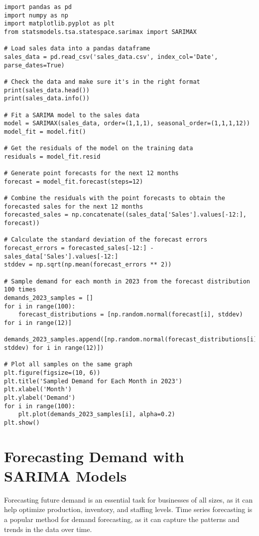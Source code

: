\begin{verbatim}
import pandas as pd
import numpy as np
import matplotlib.pyplot as plt
from statsmodels.tsa.statespace.sarimax import SARIMAX

# Load sales data into a pandas dataframe
sales_data = pd.read_csv('sales_data.csv', index_col='Date', parse_dates=True)

# Check the data and make sure it's in the right format
print(sales_data.head())
print(sales_data.info())

# Fit a SARIMA model to the sales data
model = SARIMAX(sales_data, order=(1,1,1), seasonal_order=(1,1,1,12))
model_fit = model.fit()

# Get the residuals of the model on the training data
residuals = model_fit.resid

# Generate point forecasts for the next 12 months
forecast = model_fit.forecast(steps=12)

# Combine the residuals with the point forecasts to obtain the forecasted sales for the next 12 months
forecasted_sales = np.concatenate((sales_data['Sales'].values[-12:], forecast))

# Calculate the standard deviation of the forecast errors
forecast_errors = forecasted_sales[-12:] - sales_data['Sales'].values[-12:]
stddev = np.sqrt(np.mean(forecast_errors ** 2))

# Sample demand for each month in 2023 from the forecast distribution 100 times
demands_2023_samples = []
for i in range(100):
    forecast_distributions = [np.random.normal(forecast[i], stddev) for i in range(12)]
    demands_2023_samples.append([np.random.normal(forecast_distributions[i], stddev) for i in range(12)])

# Plot all samples on the same graph
plt.figure(figsize=(10, 6))
plt.title('Sampled Demand for Each Month in 2023')
plt.xlabel('Month')
plt.ylabel('Demand')
for i in range(100):
    plt.plot(demands_2023_samples[i], alpha=0.2)
plt.show()

\end{verbatim}

\section{Forecasting Demand with SARIMA Models}

Forecasting future demand is an essential task for businesses of all sizes, as it can help optimize production, inventory, and staffing levels. Time series forecasting is a popular method for demand forecasting, as it can capture the patterns and trends in the data over time.

